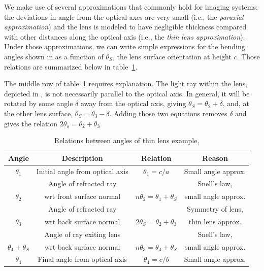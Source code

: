 We make use of several approximations that commonly hold for imaging systems: the deviations in angle from the optical axes are very small (i.e., the {\em paraxial approximation}) and the lens is modeled to have negligible thickness compared with other distances along the optical axis (i.e., the {\em thin lens approximation}).  Under those approximations, we can write simple expressions for the bending angles shown in  as a function of $\theta_S$,  the lens surface orientation at height $c$.  Those relations are summarized below in table~\ref{tab:lensmaker}.

The middle row of table~\ref{tab:lensmaker} requires explanation.  The light ray within the lens, depicted in , is not necessarily parallel to the optical axis.  In general, it will be rotated by some angle $\delta$ away from the optical axis, giving $\theta_S = \theta_2 + \delta$, and, at the other lens surface, $\theta_S = \theta_3 - \delta$.  Adding those two equations removes $\delta$ and gives the relation $2 \theta_s = \theta_2 + \theta_3$


\begin{table}
\caption{Relations between angles of thin lens example, }
\begin{center}
\begin{tabular}{| c c c c |}
\hline
{\bf Angle}  & {\bf Description} & {\bf Relation} & {\bf Reason} \\
\hline
 $\theta_1 $ &
 Initial angle from optical axis & $\theta_1 = c/a$ & Small angle approx.\\ 
  \hline
  & 
 Angle of refracted ray & & Snell's law, \\ 
  $\theta_2$ & wrt front surface normal & $n \theta_2 = \theta_1 + \theta_S$   & small angle approx. \\ 
 \hline
 &
 Angle of refracted ray & & Symmetry of lens,\\ 
  $\theta_3$ & wrt back surface normal & $2 \theta_S  = \theta_2 + \theta_3$  & thin lens approx.\\ 
 \hline
&
 Angle of ray exiting lens & & Snell's law, \\ 
  $\theta_4 + \theta_S$ & wrt back surface normal & $n \theta_3 = \theta_4+\theta_S$  & small angle approx.\\
 \hline
 $\theta_4$ &
  Final angle from optical axis & $\theta_4 = c/b$ & Small angle approx. \\
  \hline 
\end{tabular}
\end{center}
\label{tab:lensmaker}
\end{table}


